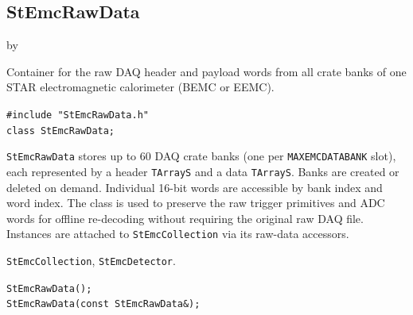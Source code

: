 \documentclass[twoside]{article}
\newcommand{\entrylabel}[1]{\mbox{\textbf{{#1}}}\hfil}%
\newenvironment{entry}
{\begin{list}{}%
    {\renewcommand{\makelabel}{\entrylabel}%
     \setlength{\labelwidth}{90pt}%
     \setlength{\leftmargin}{\labelwidth}
     \advance\leftmargin by \labelsep%
      }%
    }%
  {\end{list}}
\newcommand{\Entrylabel}[1]%
{\raisebox{0pt}[1ex][0pt]{\makebox[\labelwidth][l]%
    {\parbox[t]{\labelwidth}{\hspace{0pt}\textbf{{#1}}}}}}
\newenvironment{Entry}%
{\renewcommand{\entrylabel}{\Entrylabel}\begin{entry}}%
  {\end{entry}}
\begin{document}
\subsection{StEmcRawData}
\label{sec:StEmcRawData}
\begin{Entry}
\item[Summary]
    Container for the raw DAQ header and payload words from all crate banks
    of one STAR electromagnetic calorimeter (BEMC or EEMC).

\item[Synopsis]
    \verb+#include "StEmcRawData.h"+\\
    \verb+class StEmcRawData;+\\

\item[Description]
    \texttt{StEmcRawData} stores up to 60 DAQ crate banks (one per
    \texttt{MAXEMCDATABANK} slot), each represented by a header
    \texttt{TArrayS} and a data \texttt{TArrayS}.  Banks are created
    or deleted on demand.  Individual 16-bit words are accessible by bank
    index and word index.  The class is used to preserve the raw trigger
    primitives and ADC words for offline re-decoding without requiring
    the original raw DAQ file.  Instances are attached to
    \texttt{StEmcCollection} via its raw-data accessors.

\item[Related Classes]
    \texttt{StEmcCollection}, \texttt{StEmcDetector}.

\item[Public\\ Constructors]
    \verb+StEmcRawData();+\\
    \verb+StEmcRawData(const StEmcRawData&);+\\


\end{Entry}
\end{document}
